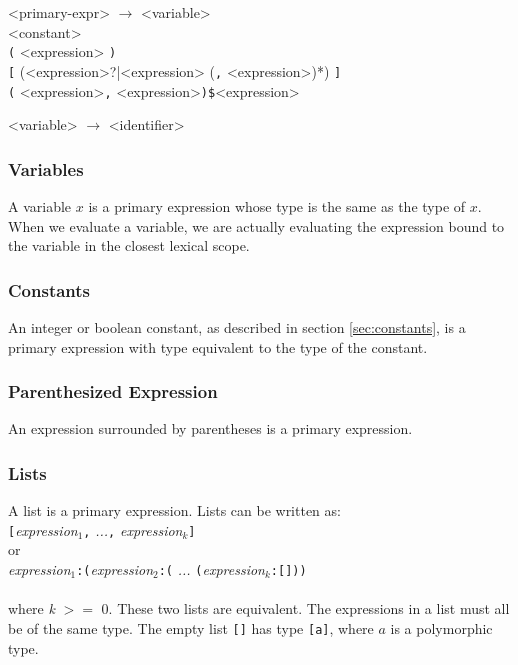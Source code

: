 \setlength{\grammarindent}{7.5em}
\begin{grammar}
<primary-expr> $\rightarrow$ <variable> \\ <constant> \\ \texttt{(} <expression> \texttt{)} \\
														\texttt{[} (<expression>?|<expression> (\texttt{,} <expression>)*) \texttt{]} \\
														\texttt{(} <expression>\texttt{,} <expression>\texttt{)\$}<expression>

<variable> $\rightarrow$ <identifier> 

\end{grammar}

\subsubsection{Variables}
A variable $x$ is a primary expression whose type is the same as the type of $x$.
When we evaluate a variable, we are actually evaluating
the expression bound to the variable in the closest lexical scope.

\subsubsection{Constants}
An integer or boolean constant, as described in section \ref{sec:constants}, is a primary expression
with type equivalent to the type of the constant.

\subsubsection{Parenthesized Expression}
An expression surrounded by parentheses is a primary expression.

\subsubsection{Lists}
A list is a primary expression. Lists can be written as: \\

\texttt{[}\emph{expression$_{1}$}\texttt{,} \emph{...}\texttt{,} \emph{expression$_{k}$}\texttt{]} \\

	or \\

  \emph{expression$_{1}$}\texttt{:(}\emph{expression$_{2}$}\texttt{:(} \emph{...} \texttt{(}\emph{expression$_{k}$}\texttt{:[]))} \\ \\
where \textit{k} $>=$ 0. These two lists are equivalent.
The expressions in a list must all be of the same type. The empty list \texttt{[]} has type
\texttt{[a]}, where $a$ is a polymorphic type.

